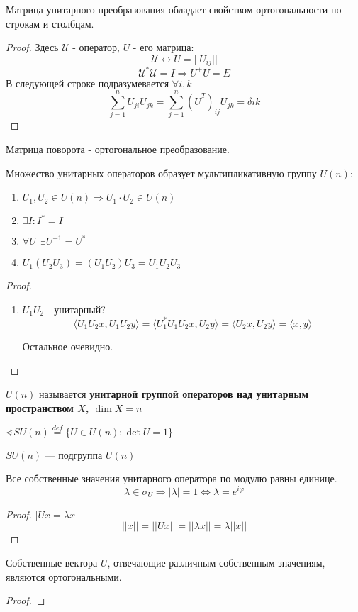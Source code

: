 \begin{lemma}
    Матрица унитарного преобразования обладает свойством ортогональности по строкам и столбцам.
\end{lemma}
\begin{proof}
    Здесь $\mathcal U$ - оператор, $U$ - его матрица:
    $$\mathcal U \leftrightarrow U=||U_{ij}||$$
    $$\mathcal U^* \mathcal U=I \Rightarrow U^+U = E$$
    В следующей строке подразумевается $\forall i,k$
    $$\sum_{j=1}^n \overline U_{ji}U_{jk}=\sum_{j=1}^n (\overline U^T)_{ij} U_{jk} = \delta{ik}$$
\end{proof}
\begin{example}
    Матрица поворота - ортогональное преобразование.
\end{example}
\begin{lemma}
    Множество унитарных операторов образует мультипликативную группу $U(n)$:
    \begin{enumerate}
        \item $U_1, U_2\in U(n) \Rightarrow U_1\cdot U_2\in U(n)$
        \item $\exists I : I^*=I$
        \item $\forall U \ \ \exists U^{-1} = U^*$
        \item $U_1(U_2U_3)=(U_1U_2)U_3=U_1U_2U_3$
    \end{enumerate}
\end{lemma}
\begin{proof}
    \begin{enumerate}
        \item $U_1U_2$ - унитарный?
        $$\langle U_1U_2x, U_1U_2y \rangle = \langle U_1^*U_1U_2x, U_2y \rangle = \langle U_2 x, U_2 y\rangle = \langle x, y\rangle$$

        Остальное очевидно.
    \end{enumerate}
\end{proof}

$U(n)$ называется \textbf{унитарной группой операторов над унитарным пространством $X$, $\dim X = n$}

$\sphericalangle SU(n) \stackrel{def}{=} \{U\in U(n) : \det U = 1\}$

\begin{lemma}
    $SU(n)$ --- подгруппа $U(n)$
\end{lemma}
\begin{lemma}
    Все собственные значения унитарного оператора по модулю равны единице.
    $$\lambda\in \sigma_U \Rightarrow |\lambda|=1 \Leftrightarrow \lambda = e^{i\varphi}$$
\end{lemma}
\begin{proof}
    $] Ux = \lambda x$
    $$||x||=||Ux||=||\lambda x||=\lambda ||x||$$
\end{proof}
\begin{lemma}
    Собственные вектора $U$, отвечающие различным собственным значениям, являются ортогональными.
\end{lemma}
\begin{proof}
\end{proof}

